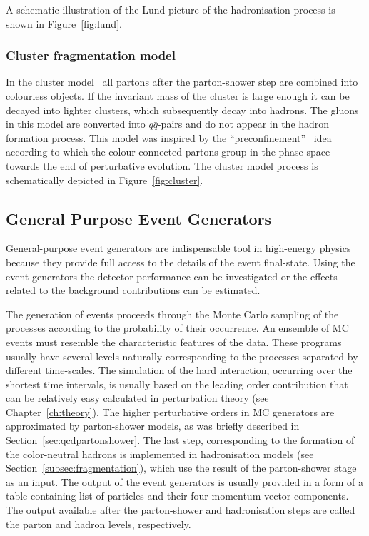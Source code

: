 A schematic illustration of the Lund picture of the hadronisation process is shown in Figure~\ref{fig:lund}.
\subsubsection{Cluster fragmentation model}
In the cluster model~\cite{Webber:1983if,Field:1982dg} all partons after the parton-shower step are combined into colourless objects. If the invariant mass of the cluster is large enough it can be decayed into lighter clusters, which subsequently decay into hadrons. The gluons in this model are converted into $q\bar{q}$-pairs and do not appear in the hadron formation process. This model was inspired by the ``preconfinement''~\cite{Amati:1979fg} idea according to which the colour connected partons group in the phase space towards the end of perturbative evolution. The cluster model process is schematically depicted in Figure~\ref{fig:cluster}.

\subsection{General Purpose Event Generators}
General-purpose event generators are indispensable tool in high-energy physics because they provide full access to the details of the event  final-state. Using the event generators the detector performance can be investigated or the effects related to the background contributions can be estimated.

The generation of events proceeds through the Monte Carlo sampling of the processes according to the probability of their occurrence. An ensemble of MC events must resemble the characteristic features of the data. These programs usually have several levels naturally corresponding to the processes separated by different time-scales. The simulation of the hard interaction, occurring over the shortest time intervals, is usually based on the leading order contribution that can be relatively easy calculated in perturbation theory (see Chapter~\ref{ch:theory}). The higher perturbative orders in MC generators are approximated by parton-shower models, as was briefly described in Section~\ref{sec:qcdpartonshower}. The last step, corresponding to the formation of the color-neutral hadrons is implemented in hadronisation models (see Section~\ref{subsec:fragmentation}), which use the result of the parton-shower stage as an input. The output of the event generators is usually provided in a form of a table containing list of particles and their four-momentum vector components. The output available after the parton-shower and hadronisation steps are called the parton and hadron levels, respectively. 

